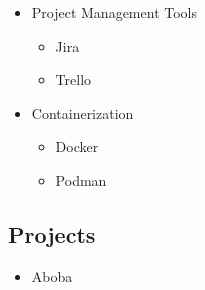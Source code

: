 \begin{itemize}
    \item Project Management Tools
    \begin{itemize}
        \item Jira
        \item Trello
    \end{itemize}

    \item Containerization
    \begin{itemize}
        \item Docker
        \item Podman
    \end{itemize}

\end{itemize}

\subsection{Projects}

\begin{itemize}
    \item Aboba
\end{itemize}

\newpage
